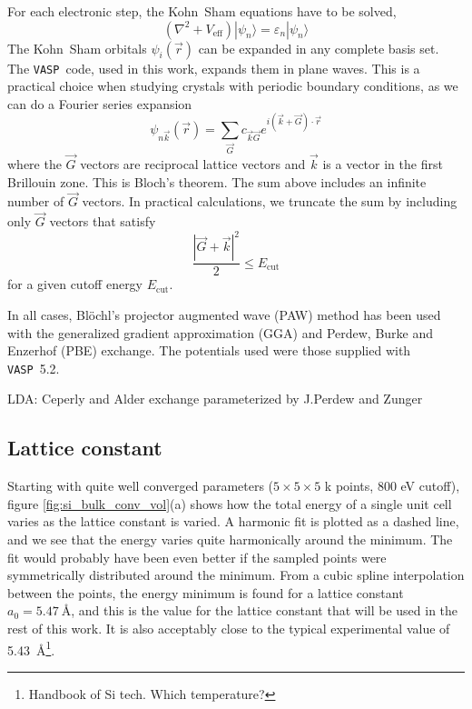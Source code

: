 \documentclass[11pt]{scrbook}   %
\newcommand{\vasp}{{\texttt{VASP}}} %
\begin{document}
For each electronic step, the Kohn~Sham equations have to be solved,
\begin{equation}
  (\nabla^2 + V_{\text{eff}}) |\psi_n\rangle = \varepsilon_n |\psi_n\rangle
\end{equation}
The Kohn~Sham orbitals $\psi_i(\vec{r})$ can be expanded in any complete basis set. 
The \vasp\ code, used in this work, expands them in plane waves. 
This is a practical choice when studying crystals with periodic boundary conditions, as we can do a Fourier series expansion
\begin{equation}
  \psi_{n\vec{k}}(\vec{r}) = \sum_{\vec{G}} c_{\vec{k}\vec{G}} e^{i(\vec{k}+\vec{G})\cdot\vec{r}}
\end{equation}
where the $\vec{G}$ vectors are reciprocal lattice vectors and $\vec{k}$ is a vector in the first Brillouin zone.
This is Bloch's theorem. The sum above includes an infinite number of $\vec{G}$ vectors. In practical calculations, we
truncate the sum by including only $\vec{G}$ vectors that satisfy
\begin{equation}
  \frac{|\vec{G}+\vec{k}|^2}{2} \leq E_{\text{cut}}
\end{equation}
for a given cutoff energy $E_{\text{cut}}$.

In all cases, Blöchl's projector augmented wave (PAW) method\cite{Blochl:1994,Kresse:1999} has been used with the generalized gradient approximation (GGA) 
and Perdew, Burke and Enzerhof (PBE) exchange. The potentials used were those supplied with \vasp\ 5.2.


LDA: Ceperly and Alder exchange parameterized by J.Perdew and Zunger

\subsection{Lattice constant}

Starting with quite well converged parameters ($5\times 5\times 5$ k points, 800 eV cutoff), figure \ref{fig:si_bulk_conv_vol}(a) shows how the total energy of a single unit cell varies as the lattice constant is varied. 
A harmonic fit is plotted as a dashed line, and we see that the energy varies quite harmonically around the minimum.
The fit would probably have been even better if the sampled points were symmetrically distributed around the minimum. 
From a cubic spline interpolation between the points, the energy minimum is found for a lattice constant $a_0=\SI{5.47}{\angstrom}$, 
and this is the value for the lattice constant that will be used in the rest of this work. 
It is also acceptably close to the typical experimental value of \SI{5.43}{\angstrom}\footnote{Handbook of Si tech. Which temperature?}. 
\end{document}
